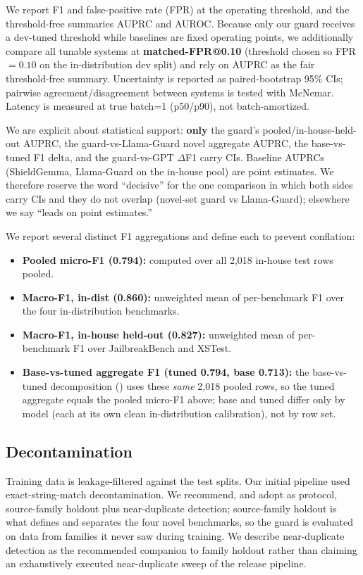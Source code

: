 \documentclass[sigconf,nonacm]{acmart}
\begin{document}
We report F1 and false-positive rate (FPR) at the operating threshold, and the threshold-free summaries AUPRC and AUROC. Because only our guard receives a dev-tuned threshold while baselines are fixed operating points, we additionally compare all tunable systems at \textbf{matched-FPR@0.10} (threshold chosen so FPR $=0.10$ on the in-distribution dev split) and rely on AUPRC as the fair threshold-free summary. Uncertainty is reported as paired-bootstrap 95\% CIs; pairwise agreement/disagreement between systems is tested with McNemar. Latency is measured at true batch=1 (p50/p90), not batch-amortized.

We are explicit about statistical support: \textbf{only} the guard's pooled/in-house-held-out AUPRC, the guard-vs-Llama-Guard novel aggregate AUPRC, the base-vs-tuned F1 delta, and the guard-vs-GPT $\Delta$F1 carry CIs. Baseline AUPRCs (ShieldGemma, Llama-Guard on the in-house pool) are point estimates. We therefore reserve the word ``decisive'' for the one comparison in which both sides carry CIs and they do not overlap (novel-set guard vs Llama-Guard); elsewhere we say ``leads on point estimates.''

We report several distinct F1 aggregations and define each to prevent conflation:

\begin{itemize}
  \item \textbf{Pooled micro-F1 (0.794):} computed over all 2,018 in-house test rows pooled.
  \item \textbf{Macro-F1, in-dist (0.860):} unweighted mean of per-benchmark F1 over the four in-distribution benchmarks.
  \item \textbf{Macro-F1, in-house held-out (0.827):} unweighted mean of per-benchmark F1 over JailbreakBench and XSTest.
  \item \textbf{Base-vs-tuned aggregate F1 (tuned 0.794, base 0.713):} the base-vs-tuned decomposition () uses these \emph{same} 2,018 pooled rows, so the tuned aggregate equals the pooled micro-F1 above; base and tuned differ only by model (each at its own clean in-distribution calibration), not by row set.
\end{itemize}

\subsection{Decontamination}

Training data is leakage-filtered against the test splits. Our initial pipeline used exact-string-match decontamination. We recommend, and adopt as protocol, source-family holdout plus near-duplicate detection; source-family holdout is what defines and separates the four novel benchmarks, so the guard is evaluated on data from families it never saw during training. We describe near-duplicate detection as the recommended companion to family holdout rather than claiming an exhaustively executed near-duplicate sweep of the release pipeline.
\end{document}
